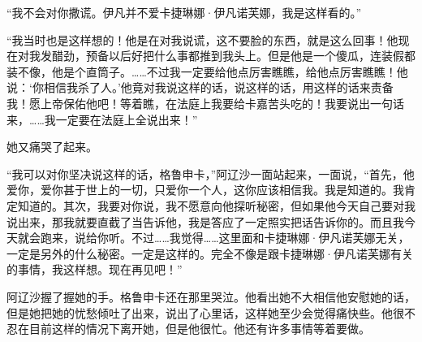 \par “我不会对你撒谎。伊凡并不爱卡捷琳娜·伊凡诺芙娜，我是这样看的。”
\par “我当时也是这样想的！他是在对我说谎，这不要脸的东西，就是这么回事！他现在对我发醋劲，预备以后好把什么事都推到我头上。但是他是一个傻瓜，连装假都装不像，他是个直筒子。……不过我一定要给他点厉害瞧瞧，给他点厉害瞧瞧！他说：‘你相信我杀了人。’他竟对我说这样的话，说这样的话，用这样的话来责备我！愿上帝保佑他吧！等着瞧，在法庭上我要给卡嘉苦头吃的！我要说出一句话来，……我一定要在法庭上全说出来！”
\par 她又痛哭了起来。
\par “我可以对你坚决说这样的话，格鲁申卡，”阿辽沙一面站起来，一面说，“首先，他爱你，爱你甚于世上的一切，只爱你一个人，这你应该相信我。我是知道的。我肯定知道的。其次，我要对你说，我不愿意向他探听秘密，但如果他今天自己要对我说出来，那我就要直截了当告诉他，我是答应了一定照实把话告诉你的。而且我今天就会跑来，说给你听。不过……我觉得……这里面和卡捷琳娜·伊凡诺芙娜无关，一定是另外的什么秘密。一定是这样的。完全不像是跟卡捷琳娜·伊凡诺芙娜有关的事情，我这样想。现在再见吧！”
\par 阿辽沙握了握她的手。格鲁申卡还在那里哭泣。他看出她不大相信他安慰她的话，但是她把她的忧愁倾吐了出来，说出了心里话，这样她至少会觉得痛快些。他很不忍在目前这样的情况下离开她，但是他很忙。他还有许多事情等着要做。
